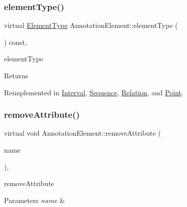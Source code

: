 \subsubsection{\texorpdfstring{element\+Type()}{elementType()}}
{\footnotesize\ttfamily virtual \hyperlink{class_annotation_element_af5282990ffbe25eeea8ab02037e344b0}{Element\+Type} Annotation\+Element\+::element\+Type (\begin{DoxyParamCaption}{ }\end{DoxyParamCaption}) const\hspace{0.3cm}{\ttfamily [inline]}, {\ttfamily [virtual]}}



element\+Type 

\begin{DoxyReturn}{Returns}

\end{DoxyReturn}


Reimplemented in \hyperlink{class_interval_a3ea5342504df09262d59cd2ab1658804}{Interval}, \hyperlink{class_sequence_a09f57e396cbb4a9de8caa81ca3b96ad1}{Sequence}, \hyperlink{class_relation_a31e74e5707090aedfa225289b06683f4}{Relation}, and \hyperlink{class_point_ac576e4660a79cf5bbffa4591a22d2a28}{Point}.

\mbox{\label{class_annotation_element_a0acb66aa65f201880286d82dda4d82bf}} 
\subsubsection{\texorpdfstring{remove\+Attribute()}{removeAttribute()}}
{\footnotesize\ttfamily virtual void Annotation\+Element\+::remove\+Attribute (\begin{DoxyParamCaption}\item[{const Q\+String \&}]{name }\end{DoxyParamCaption})\hspace{0.3cm}{\ttfamily [inline]}, {\ttfamily [virtual]}}



remove\+Attribute 


\begin{DoxyParams}{Parameters}
{\em name} & \\
\hline
\end{DoxyParams}
\mbox{\label{class_annotation_element_aafa5f3ee2d42db969bafb453e16c35b3}} 
